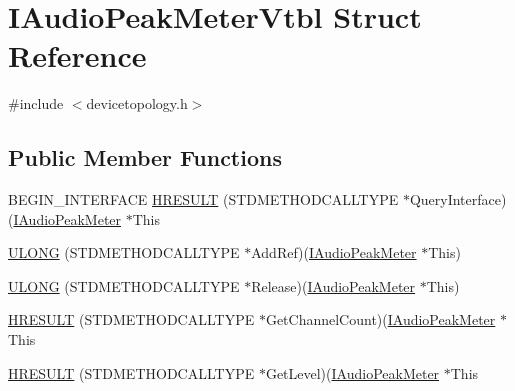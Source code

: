 \hypertarget{struct_i_audio_peak_meter_vtbl}{}\section{I\+Audio\+Peak\+Meter\+Vtbl Struct Reference}
\label{struct_i_audio_peak_meter_vtbl}


{\ttfamily \#include $<$devicetopology.\+h$>$}

\subsection*{Public Member Functions}
\begin{DoxyCompactItemize}
\item 
B\+E\+G\+I\+N\+\_\+\+I\+N\+T\+E\+R\+F\+A\+CE \hyperlink{struct_i_audio_peak_meter_vtbl_ad03d8a375dee113d5af7ac0c2ba5d326}{H\+R\+E\+S\+U\+LT} (S\+T\+D\+M\+E\+T\+H\+O\+D\+C\+A\+L\+L\+T\+Y\+PE $\ast$Query\+Interface)(\hyperlink{devicetopology_8h_ad573645ce25069e465d68516de9f74ab}{I\+Audio\+Peak\+Meter} $\ast$This
\item 
\hyperlink{struct_i_audio_peak_meter_vtbl_acb34ee7b48174ad1f84a8b636a9d4379}{U\+L\+O\+NG} (S\+T\+D\+M\+E\+T\+H\+O\+D\+C\+A\+L\+L\+T\+Y\+PE $\ast$Add\+Ref)(\hyperlink{devicetopology_8h_ad573645ce25069e465d68516de9f74ab}{I\+Audio\+Peak\+Meter} $\ast$This)
\item 
\hyperlink{struct_i_audio_peak_meter_vtbl_ac839f376d7d4d99614daefd65913e18e}{U\+L\+O\+NG} (S\+T\+D\+M\+E\+T\+H\+O\+D\+C\+A\+L\+L\+T\+Y\+PE $\ast$Release)(\hyperlink{devicetopology_8h_ad573645ce25069e465d68516de9f74ab}{I\+Audio\+Peak\+Meter} $\ast$This)
\item 
\hyperlink{struct_i_audio_peak_meter_vtbl_a4d492d9b84f69a52f401ab7fde109940}{H\+R\+E\+S\+U\+LT} (S\+T\+D\+M\+E\+T\+H\+O\+D\+C\+A\+L\+L\+T\+Y\+PE $\ast$Get\+Channel\+Count)(\hyperlink{devicetopology_8h_ad573645ce25069e465d68516de9f74ab}{I\+Audio\+Peak\+Meter} $\ast$This
\item 
\hyperlink{struct_i_audio_peak_meter_vtbl_a6838ee1e9982062fe1d8629b1a381daa}{H\+R\+E\+S\+U\+LT} (S\+T\+D\+M\+E\+T\+H\+O\+D\+C\+A\+L\+L\+T\+Y\+PE $\ast$Get\+Level)(\hyperlink{devicetopology_8h_ad573645ce25069e465d68516de9f74ab}{I\+Audio\+Peak\+Meter} $\ast$This
\end{DoxyCompactItemize}
